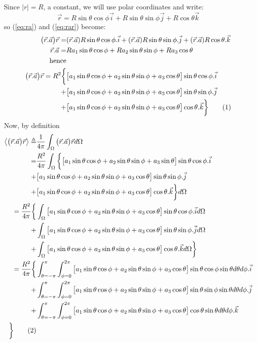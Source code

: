 \documentclass[]{article}
\newcommand\numberthis{\addtocounter{equation}{1}\tag{\theequation}}
\begin{document}
Since $|r|=R$, a constant, we will use polar coordinates and write:
$$\vec{r}=R\sin\theta\cos\phi\vec{i}+R\sin\theta\sin\phi\vec{j}+R\cos\theta\vec{k}$$
so (\ref{eq:ra}) and (\ref{eq:rar}) become:
\begin{align*}
\big(\vec{r}.\vec{a}\big)\vec{r} =& (\vec{r}.\vec{a}) R \sin\theta\cos\phi .\vec{i} + (\vec{r}.\vec{a})R\sin\theta\sin\phi . \vec{j} + (\vec{r}.\vec{a}) R\cos\theta. \vec{k}\\
\vec{r}.\vec{a} =& Ra_1\sin\theta\cos\phi + Ra_2\sin\theta\sin\phi + Ra_3 \cos\theta\\
\text{hence}&\\
\big(\vec{r}.\vec{a}\big)\vec{r} = R^2 \bigg\{& \big[a_1\sin\theta\cos\phi + a_2\sin\theta\sin\phi + a_3 \cos\theta\big] \sin\theta\cos\phi.\vec{i}\\ +& \big[a_1\sin\theta\cos\phi + a_2\sin\theta\sin\phi + a_3 \cos\theta\big]\sin\theta\sin\phi. \vec{j}\\
 +& \big[a_1\sin\theta\cos\phi + a_2\sin\theta\sin\phi + a_3 \cos\theta\big] \cos\theta. \vec{k}\bigg\}\numberthis \label{eq:rar_expanded}
\end{align*}
Now, by definition
\begin{align*}
\left\langle \big(\vec{r}.\vec{a}\big)\vec{r} \right\rangle \triangleq& \frac{1}{4\pi}\int_{\Omega}\big(\vec{r}.\vec{a}\big)\vec{r} d\Omega \\
=&  \frac{ R^2}{4\pi}\int_{\Omega} \bigg\{ \big[a_1\sin\theta\cos\phi + a_2\sin\theta\sin\phi + a_3 \sin\theta\big] \sin\theta\cos\phi.\vec{i}\\ +& \big[a_1\sin\theta\cos\phi + a_2\sin\theta\sin\phi + a_3 \cos\theta\big]\sin\theta\sin\phi .\vec{j}\\
+& \big[a_1\sin\theta\cos\phi + a_2\sin\theta\sin\phi + a_3 \cos\theta\big] \cos\theta. \vec{k}\bigg\}d\Omega\\
= \frac{ R^2}{4\pi} \bigg\{&\int_{\Omega}\big[a_1\sin\theta\cos\phi + a_2\sin\theta\sin\phi + a_3 \cos\theta\big] \sin\theta\cos\phi.\vec{i}d\Omega\\ +& \int_{\Omega}\big[a_1\sin\theta\cos\phi + a_2\sin\theta\sin\phi + a_3 \cos\theta\big]\sin\theta\sin\phi .\vec{j}d\Omega\\
+& \int_{\Omega}\big[a_1\sin\theta\cos\phi + a_2\sin\theta\sin\phi + a_3 \cos\theta\big] \cos\theta. \vec{k} d\Omega\bigg\}\\
= \frac{ R^2}{4\pi} \bigg\{&\int_{\theta=-\pi}^{\pi}\int_{\phi=0}^{2\pi}\big[a_1\sin\theta\cos\phi + a_2\sin\theta\sin\phi + a_3 \cos\theta\big] \sin\theta\cos\phi\sin\theta d\theta d\phi.\vec{i}\\
 +& \int_{\theta=-\pi}^{\pi}\int_{\phi=0}^{2\pi}\big[a_1\sin\theta\cos\phi + a_2\sin\theta\sin\phi + a_3 \cos\theta\big]\sin\theta\sin\phi \sin\theta d\theta d\phi.\vec{j}\\
+& \int_{\theta=-\pi}^{\pi}\int_{\phi=0}^{2\pi}\big[a_1\sin\theta\cos\phi + a_2\sin\theta\sin\phi + a_3 \cos\theta\big] \cos\theta \sin\theta d\theta d\phi.\vec{k}\\ \bigg\} \numberthis \label{eq:big-int}
\end{align*}
\end{document}
